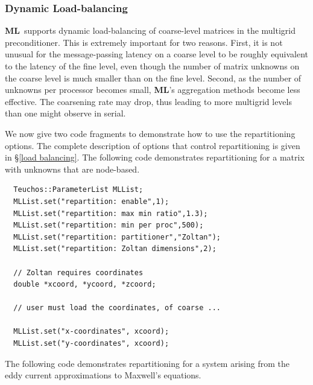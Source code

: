 \documentclass{article}[11pt]
\newcommand{\ML}     {{\bf ML}}
\newcommand{\zoltan}  {{\sc Zoltan}}
\begin{document}
\subsubsection{Dynamic Load-balancing} \label{dynamic load balancing}
\ML\ supports dynamic load-balancing of coarse-level matrices in the multigrid
preconditioner.
This is extremely important for two reasons.
First, it is not unusual for the message-passing latency on a coarse level
to be roughly equivalent to the latency of the fine level,
even though the number of matrix unknowns on the coarse level is much smaller
than on the fine level.
Second, as the number of unknowns per processor becomes small, \ML's
aggregation methods become less effective.
The coarsening rate may drop, thus leading to more multigrid levels than one
might observe in serial.

We now give two code fragments to demonstrate how to use the repartitioning
options.
The complete description of options that control repartitioning is given in
\S\ref{load balancing}.
The following code demonstrates repartitioning for a matrix with
unknowns that are node-based.
\begin{verbatim}
  Teuchos::ParameterList MLList;
  MLList.set("repartition: enable",1);
  MLList.set("repartition: max min ratio",1.3);
  MLList.set("repartition: min per proc",500);
  MLList.set("repartition: partitioner","Zoltan");
  MLList.set("repartition: Zoltan dimensions",2);

  // Zoltan requires coordinates
  double *xcoord, *ycoord, *zcoord;

  // user must load the coordinates, of coarse ...

  MLList.set("x-coordinates", xcoord); 
  MLList.set("y-coordinates", xcoord); 
\end{verbatim}

\noindent
The following code demonstrates repartitioning for a system arising from the
eddy current approximations to Maxwell's equations.
\end{document}

